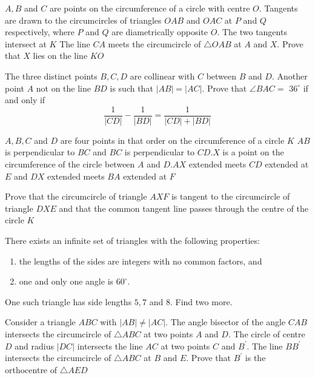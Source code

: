 \documentclass{pset}
\begin{document}
\begin{problems}
\begin{problem}[IrMO 2013 Q5]
    \(A, B\) and \(C\) are points on the circumference of a circle with centre \(O .\) Tangents are drawn to the circumcircles of triangles \(O A B\) and \(O A C\) at \(P\) and \(Q\) respectively, where \(P\) and \(Q\) are diametrically opposite \(O .\) The two tangents intersect at \(K\) The line \(C A\) meets the circumcircle of \(\triangle O A B\) at \(A\) and \(X .\) Prove that \(X\) lies on the line \(K O\)
\end{problem}

\begin{problem}[IrMO 2013 Q6]
    The three distinct points \(B, C, D\) are collinear with \(C\) between \(B\) and \(D .\) Another point \(A\) not on the line \(B D\) is such that \(|A B|=|A C| .\) Prove that \(\angle B A C=\) \(36^{\circ}\) if and only if
    $$
    \frac{1}{|C D|}-\frac{1}{|B D|}=\frac{1}{|C D|+|B D|}
    $$
\end{problem}


\begin{problem}[IrMO 2012 Q2]
    \(A, B, C\) and \(D\) are four points in that order on the circumference of a circle \(K\)
    \(A B\) is perpendicular to \(B C\) and \(B C\) is perpendicular to \(C D . X\) is a point on the circumference of the circle between \(A\) and \(D . A X\) extended meets \(C D\) extended
    at \(E\) and \(D X\) extended meets \(B A\) extended at \(F\)

    Prove that the circumcircle of triangle \(A X F\) is tangent to the circumcircle of triangle \(D X E\) and that the common tangent line passes through the centre of the circle \(K\)
\end{problem}

\begin{problem}[IrMO 2012 Q4]
    There exists an infinite set of triangles with the following properties:
    \begin{enumerate}
    \item the lengths of the sides are integers with no common factors, and
    \item one and only one angle is \(60^{\circ} .\)
    \end{enumerate}
    One such triangle has side lengths \(5,7\) and \(8 .\) Find two more.
\end{problem}


\begin{problem}[IrMO 2012 Q7]
    Consider a triangle \(A B C\) with \(|A B| \neq|A C| .\) The angle bisector of the angle \(C A B\) intersects the circumcircle of \(\triangle A B C\) at two points \(A\) and \(D .\) The circle of centre
    \(D\) and radius \(|D C|\) intersects the line \(A C\) at two points \(C\) and \(B^{\prime} .\) The line \(B B^{\prime}\) intersects the circumcircle of \(\triangle A B C\) at \(B\) and \(E .\) Prove that \(B^{\prime}\) is the orthocentre
    of \(\triangle A E D\)
\end{problem}


\end{problems}
\end{document}
